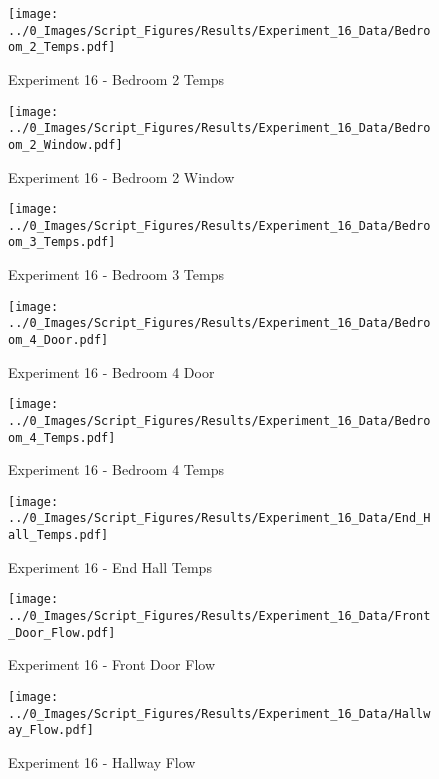 	\begin{figure}[H]
		\centering
		\texttt{[image: ../0\_Images/Script\_Figures/Results/Experiment\_16\_Data/Bedroom\_2\_Temps.pdf]}
		\caption[]{Experiment 16 - Bedroom 2 Temps}
	\end{figure}
 
	\clearpage

	\begin{figure}[H]
		\centering
		\texttt{[image: ../0\_Images/Script\_Figures/Results/Experiment\_16\_Data/Bedroom\_2\_Window.pdf]}
		\caption[]{Experiment 16 - Bedroom 2 Window}
	\end{figure}
 

	\begin{figure}[H]
		\centering
		\texttt{[image: ../0\_Images/Script\_Figures/Results/Experiment\_16\_Data/Bedroom\_3\_Temps.pdf]}
		\caption[]{Experiment 16 - Bedroom 3 Temps}
	\end{figure}
 
	\clearpage

	\begin{figure}[H]
		\centering
		\texttt{[image: ../0\_Images/Script\_Figures/Results/Experiment\_16\_Data/Bedroom\_4\_Door.pdf]}
		\caption[]{Experiment 16 - Bedroom 4 Door}
	\end{figure}
 

	\begin{figure}[H]
		\centering
		\texttt{[image: ../0\_Images/Script\_Figures/Results/Experiment\_16\_Data/Bedroom\_4\_Temps.pdf]}
		\caption[]{Experiment 16 - Bedroom 4 Temps}
	\end{figure}
 
	\clearpage

	\begin{figure}[H]
		\centering
		\texttt{[image: ../0\_Images/Script\_Figures/Results/Experiment\_16\_Data/End\_Hall\_Temps.pdf]}
		\caption[]{Experiment 16 - End Hall Temps}
	\end{figure}
 

	\begin{figure}[H]
		\centering
		\texttt{[image: ../0\_Images/Script\_Figures/Results/Experiment\_16\_Data/Front\_Door\_Flow.pdf]}
		\caption[]{Experiment 16 - Front Door Flow}
	\end{figure}
 
	\clearpage

	\begin{figure}[H]
		\centering
		\texttt{[image: ../0\_Images/Script\_Figures/Results/Experiment\_16\_Data/Hallway\_Flow.pdf]}
		\caption[]{Experiment 16 - Hallway Flow}
	\end{figure}
 

